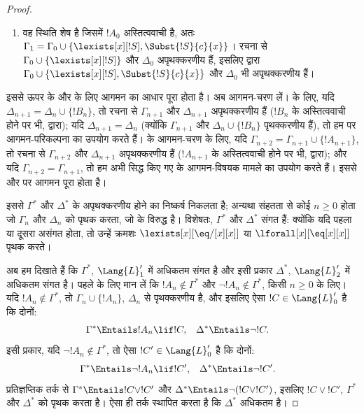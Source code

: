\documentclass[../../../include/open-logic-section]{subfiles}
\begin{document}
\begin{proof}
\begin{enumerate}
\item वह स्थिति शेष है जिसमें $!A_0$ अस्तित्ववाची है, अतः
  $\Gamma_1 = \Gamma_0 \cup \{ \lexists[x][!S], \Subst{!S}{c}{x}
  \}$। रचना से $\Gamma_0 \cup \{ \lexists[x][!S]\}$ और $\Delta_0$
  अपृथक्करणीय हैं, इसलिए  द्वारा
  $\Gamma_0 \cup \{ \lexists[x][!S], \Subst{!S}{c}{x} \}$ और
  $\Delta_0$ भी अपृथक्करणीय हैं।
\end{enumerate}
इससे ऊपर के  और  के लिए आगमन का आधार पूरा
होता है। अब आगमन-चरण लें।  के लिए, यदि
$\Delta_{n+1} = \Delta_n \cup \{ !B_n \}$, तो रचना से
$\Gamma_{n+1}$ और $\Delta_{n+1}$ अपृथक्करणीय हैं ($!B_n$ के
अस्तित्ववाची होने पर भी,  द्वारा); यदि
$\Delta_{n+1} = \Delta_n$ (क्योंकि $\Gamma_{n+1}$ और
$\Delta_n \cup \{!B_n\}$ पृथक्करणीय हैं), तो हम  पर
आगमन-परिकल्पना का उपयोग करते हैं।  के आगमन-चरण के लिए, यदि
$\Gamma_{n+2} = \Gamma_{n+1} \cup
\{!A_{n+1} \}$, तो रचना से
$\Gamma_{n+2}$ और $\Delta_{n+1}$ अपृथक्करणीय हैं ($!A_{n+1}$ के
अस्तित्ववाची होने पर भी,  द्वारा); और यदि
$\Gamma_{n+2} = \Gamma_{n+1}$, तो हम अभी सिद्ध किए गए
 के आगमन-विषयक मामले का उपयोग करते हैं। इससे
 और  पर आगमन पूरा होता है।

इससे $\Gamma^*$ और $\Delta^*$ के अपृथक्करणीय होने का निष्कर्ष निकलता
है; अन्यथा संहतता से कोई $n \ge 0$ होता जो $\Gamma_n$ और $\Delta_n$
को पृथक करता, जो  के विरुद्ध है। विशेषतः, $\Gamma^*$ और
$\Delta^*$ संगत हैं: क्योंकि यदि पहला या दूसरा असंगत होता, तो उन्हें
क्रमशः $\lexists[x][\eq/[x][x]]$ या $\lforall[x][\eq[x][x]]$ पृथक
करते।

अब हम दिखाते हैं कि $\Gamma^*$, $\Lang{L}'_1$ में अधिकतम संगत है और इसी
प्रकार $\Delta^*$, $\Lang{L}'_2$ में अधिकतम संगत है। पहले के लिए मान लें
कि $!A_n \notin \Gamma^*$ और $\lnot !A_n
\notin \Gamma^*$, किसी $n \ge 0$ के लिए। यदि $!A_n \notin \Gamma^*$, तो
$\Gamma_n \cup \{!A_n \}$, $\Delta_n$ से पृथक्करणीय है, और इसलिए ऐसा
$!C \in \Lang{L}'_0$ है कि दोनों:
\begin{align*}
  \Gamma^* & \Entails !A_n \lif !C, & 
  \Delta^* & \Entails \lnot !C.
\end{align*}
इसी प्रकार, यदि $\lnot !A_n \notin \Gamma^*$, तो ऐसा
$!C' \in
\Lang{L}'_0$ है कि दोनों:
\begin{align*}
  \Gamma^* & \Entails \lnot !A_n \lif !C', & 
  \Delta^* & \Entails \lnot !C'.
\end{align*}
प्रतिज्ञप्तिक तर्क से $\Gamma^* \Entails !C \lor !C'$ और
$\Delta^* \Entails \lnot (!C \lor !C')$, इसलिए $!C \lor
!C'$, $\Gamma^*$ और $\Delta^*$ को पृथक करता है। ऐसा ही तर्क स्थापित
करता है कि $\Delta^*$ अधिकतम है।


\end{proof}
\end{document}

